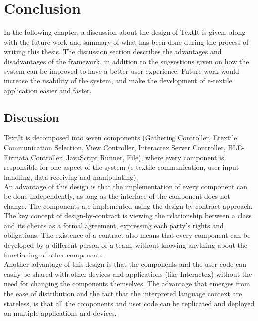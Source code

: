 \chapter{Conclusion}

In the following chapter, a discussion about the design of TextIt is given, along with the future work and summary of what has been done during the process of writing this thesis. The discussion section describes the advantages and disadvantages of the framework, in addition to the suggestions given on how the system can be improved to have a better user experience. Future work would increase the usability of the system, and make the development of e-textile application easier and faster. 


\section{Discussion}
TextIt is decomposed into seven components (Gathering Controller, Etextile Communication Selection, View Controller, Interactex Server Controller, BLE-Firmata Controller, JavaScript Runner, File), where every component is responsible for one aspect of the system (e-textile communication, user input handling, data receiving and manipulating).
\\ 

	An advantage of this design is that the implementation of every component can be done independently, as long as the interface of the component does not change. The components are implemented using the design-by-contract approach. The key concept of design-by-contract is viewing the relationship between a class and its clients as a formal agreement, expressing each party's rights and obligations. The existence of a contract also means that every component can be developed by a different person or a team, without knowing anything about the functioning of other components. \\
	
Another advantage of this design is that the components and the user code can easily be shared with other devices and applications (like Interactex) without the need for changing the components themselves. The advantage that emerges from the ease of distribution and the fact that the interpreted language context are stateless, is that all the components and user code can be replicated and deployed on multiple applications and devices.\\


